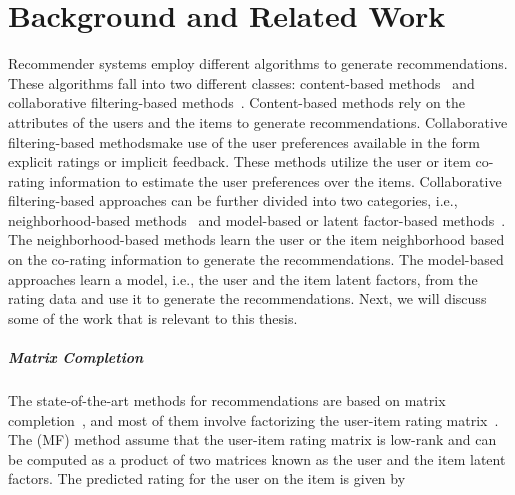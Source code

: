 \chapter{Background and Related Work}
\label{ch:related}

Recommender systems employ different algorithms to generate recommendations. These algorithms fall into
two different classes: content-based methods~\cite{lops2011content,pazzani2007content} and collaborative filtering-based methods~\cite{herlocker1999algorithmic}. Content-based methods rely on the attributes of the users and the items to generate recommendations. Collaborative filtering-based
methodsmake use of the user preferences available in the form explicit ratings or implicit feedback. These
methods utilize the user or item co-rating information to estimate the user preferences over the items.
Collaborative filtering-based approaches can be further divided into two categories, i.e., neighborhood-based
methods~\cite{shardanand1995social, konstan1997grouplens, SarwarKarypis01, deshpande2004item} and model-based or latent factor-based methods~\cite{koren2008factorization,Koren2009,koren2010collaborative}.  The neighborhood-based methods learn the user or the
item neighborhood based on the co-rating information to generate the recommendations.  The model-based approaches
learn a model, i.e., the user and the item latent factors,  from the rating data and use it to generate the
recommendations. Next, we will discuss some of the work that is relevant to this thesis.







\paragraph{Matrix Completion}
The state-of-the-art methods for recommendations are based on matrix
completion~\cite{CandesRecht09}, and most of them involve factorizing the user-item rating
matrix~\cite{Koren2009, koren2008factorization, hu2008collaborative}.
The \MF (MF) method assume that the
user-item rating matrix is low-rank and can be computed as a product of two
matrices known as the user and the item latent factors. 
%
%
The predicted rating for the user \usru on the item \itmi is given by

